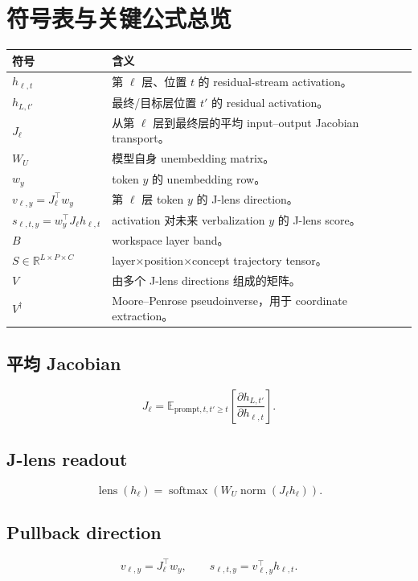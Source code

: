 \documentclass[10.5pt,a4paper]{ctexart}
\begin{document}
\appendix

\section{符号表与关键公式总览}

\begin{longtable}{p{}p{}}
\toprule
符号 & 含义 \\
\midrule
$h_{\ell,t}$ & 第 $\ell$ 层、位置 $t$ 的 residual-stream activation。 \\
$h_{L,t'}$ & 最终/目标层位置 $t'$ 的 residual activation。 \\
$J_\ell$ & 从第 $\ell$ 层到最终层的平均 input--output Jacobian transport。 \\
$W_U$ & 模型自身 unembedding matrix。 \\
$w_y$ & token $y$ 的 unembedding row。 \\
$v_{\ell,y}=J_\ell^\top w_y$ & 第 $\ell$ 层 token $y$ 的 J-lens direction。 \\
$s_{\ell,t,y}=w_y^\top J_\ell h_{\ell,t}$ & activation 对未来 verbalization $y$ 的 J-lens score。 \\
$B$ & workspace layer band。 \\
$S\in\mathbb R^{L\times P\times C}$ & layer$\times$position$\times$concept trajectory tensor。 \\
$V$ & 由多个 J-lens directions 组成的矩阵。 \\
$V^\dagger$ & Moore--Penrose pseudoinverse，用于 coordinate extraction。 \\
\bottomrule
\end{longtable}

\subsection{平均 Jacobian}
\[
J_\ell
=
\mathbb E_{\text{prompt},t,t'\ge t}
\left[
\frac{\partial h_{L,t'}}{\partial h_{\ell,t}}
\right].
\]

\subsection{J-lens readout}
\[
\operatorname{lens}(h_\ell)
=
\operatorname{softmax}
\left(
W_U\operatorname{norm}(J_\ell h_\ell)
\right).
\]

\subsection{Pullback direction}
\[
v_{\ell,y}=J_\ell^\top w_y,
\qquad
s_{\ell,t,y}=v_{\ell,y}^\top h_{\ell,t}.
\]
\end{document}
